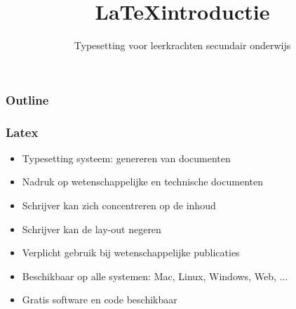 \documentclass[13pt]{beamer}
\title{\LaTeX introductie}
\subtitle{Typesetting voor leerkrachten secundair onderwijs}
\author{}
\institute{}
\date{}%
\begin{document}
\begin{frame}
  \titlepage%
\end{frame}

\begin{frame}
  \frametitle{Outline}
  \tableofcontents
\end{frame}

\begin{frame}
  \frametitle{Latex}
  \begin{itemize}
  \item Typesetting systeem: genereren van documenten
  \item Nadruk op wetenschappelijke en technische documenten
  \item Schrijver kan zich concentreren op de inhoud
  \item Schrijver kan de lay-out negeren
  \item Verplicht gebruik bij wetenschappelijke publicaties
  \item Beschikbaar op alle systemen: Mac, Linux, Windows, Web, ...
  \item Gratis software en code beschikbaar
  \end{itemize}
\end{frame}
\end{document}
